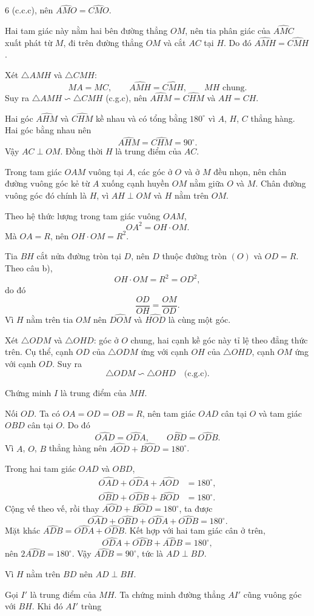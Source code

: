\begin{Solbook}{6}
(c.c.c), nên $\widehat {AMO}=\widehat {CMO}$. \par Hai tam giác này nằm hai bên đường thẳng $OM$, nên tia phân giác của $\widehat {AMC}$ xuất phát từ $M$, đi trên đường thẳng $OM$ và cắt $AC$ tại $H$. Do đó $\widehat {AMH}=\widehat {CMH}$. \par Xét $\triangle AMH$ và $\triangle CMH$: \[ MA=MC,\qquad \widehat {AMH}=\widehat {CMH},\qquad MH\text { chung}. \] Suy ra $\triangle AMH\backsim \triangle CMH$ (c.g.c), nên $\widehat {AHM}=\widehat {CHM}$ và $AH=CH$. \par Hai góc $\widehat {AHM}$ và $\widehat {CHM}$ kề nhau và có tổng bằng $180^\circ $ vì $A$, $H$, $C$ thẳng hàng. Hai góc bằng nhau nên \[ \widehat {AHM}=\widehat {CHM}=90^\circ . \] Vậy $AC\perp OM$. Đồng thời $H$ là trung điểm của $AC$. \par Trong tam giác $OAM$ vuông tại $A$, các góc ở $O$ và ở $M$ đều nhọn, nên chân đường vuông góc kẻ từ $A$ xuống cạnh huyền $OM$ nằm giữa $O$ và $M$. Chân đường vuông góc đó chính là $H$, vì $AH\perp OM$ và $H$ nằm trên $OM$. \par Theo hệ thức lượng trong tam giác vuông $OAM$, \[ OA^2=OH\cdot OM. \] Mà $OA=R$, nên $OH\cdot OM=R^2$. \par \item Tia $BH$ cắt nửa đường tròn tại $D$, nên $D$ thuộc đường tròn $(O)$ và $OD=R$. Theo câu b), \[ OH\cdot OM=R^2=OD^2, \] do đó \[ \dfrac {OD}{OH}=\dfrac {OM}{OD}. \] Vì $H$ nằm trên tia $OM$ nên $\widehat {DOM}$ và $\widehat {HOD}$ là cùng một góc. \par Xét $\triangle ODM$ và $\triangle OHD$: góc ở $O$ chung, hai cạnh kề góc này tỉ lệ theo đẳng thức trên. Cụ thể, cạnh $OD$ của $\triangle ODM$ ứng với cạnh $OH$ của $\triangle OHD$, cạnh $OM$ ứng với cạnh $OD$. Suy ra \[ \triangle ODM\backsim \triangle OHD \quad \text {(c.g.c)}. \] \par Chứng minh $I$ là trung điểm của $MH$. \par Nối $OD$. Ta có $OA=OD=OB=R$, nên tam giác $OAD$ cân tại $O$ và tam giác $OBD$ cân tại $O$. Do đó \[ \widehat {OAD}=\widehat {ODA},\qquad \widehat {OBD}=\widehat {ODB}. \] Vì $A$, $O$, $B$ thẳng hàng nên $\widehat {AOD}+\widehat {BOD}=180^\circ $. \par Trong hai tam giác $OAD$ và $OBD$, \begin {align*} \widehat {OAD}+\widehat {ODA}+\widehat {AOD}&=180^\circ ,\\ \widehat {OBD}+\widehat {ODB}+\widehat {BOD}&=180^\circ . \end {align*} Cộng vế theo vế, rồi thay $\widehat {AOD}+\widehat {BOD}=180^\circ $, ta được \[ \widehat {OAD}+\widehat {OBD}+\widehat {ODA}+\widehat {ODB}=180^\circ . \] Mặt khác $\widehat {ADB}=\widehat {ODA}+\widehat {ODB}$. Kết hợp với hai tam giác cân ở trên, \[ \widehat {ODA}+\widehat {ODB}+\widehat {ADB}=180^\circ , \] nên $2\widehat {ADB}=180^\circ $. Vậy $\widehat {ADB}=90^\circ $, tức là $AD\perp BD$. \par Vì $H$ nằm trên $BD$ nên $AD\perp BH$. \par Gọi $I'$ là trung điểm của $MH$. Ta chứng minh đường thẳng $AI'$ cũng vuông góc với $BH$. Khi đó $AI'$ trùng 
\end{Solbook}
